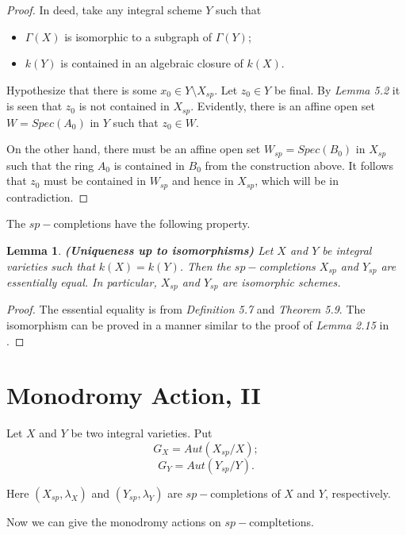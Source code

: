 \documentclass[12pt,twoside,reqno]{amsart}
\newtheorem{lemma}[theorem]{Lemma}
\theoremstyle{definition}
\numberwithin{equation}{section}
\begin{document}
\begin{proof}
In deed, take any integral scheme $Y$ such that
\begin{itemize}
\item $\Gamma (X)$ is isomorphic to a subgraph of $\Gamma (Y)$;

\item $k(Y)$ is contained in an algebraic closure of $k(X)$.
\end{itemize}

 Hypothesize that there is some $x_{0}\in Y \setminus X_{sp}$. Let $z_{0}\in Y$ be final. By \emph{Lemma 5.2} it is seen that $z_{0}$ is not contained in $X_{sp}$. Evidently, there is an affine open set $W=Spec(A_{0})$ in $Y$ such that $z_{0}\in W$.

 On the other hand, there must be an affine open set $W_{sp}=Spec(B_{0})$ in $X_{sp}$ such that the ring $A_{0}$ is contained in $B_{0}$ from the construction above. It follows that $z_{0}$ must be contained in $W_{sp}$ and hence in $X_{sp}$, which will be in contradiction.
\end{proof}

The $sp-$completions have the following property.

\begin{lemma}
\emph{\textbf{(Uniqueness up to isomorphisms)}}
Let $X$ and $Y$ be integral varieties such that $k(X)=k(Y)$. Then the $sp-$completions $X_{sp}$ and $Y_{sp}$ are essentially equal. In particular,  $X_{sp}$ and $Y_{sp}$ are isomorphic schemes.
\end{lemma}

\begin{proof}
The essential equality is from \emph{Definition 5.7} and \emph{Theorem 5.9}. The isomorphism can be proved in a manner similar to the proof of \emph{Lemma 2.15} in \cite{An4*}.
\end{proof}

\section{Monodromy Action, II}

Let $X$ and $Y$ be two integral varieties. Put $$G_{X}=Aut(X_{sp}/X);$$ $$G_{Y}=Aut(Y_{sp}/Y).$$

Here $(X_{sp},\lambda_{X})$ and $(Y_{sp},\lambda_{Y})$ are $sp-$completions of $X$ and $Y$, respectively.

Now we can give the monodromy actions on $sp-$compltetions.
\end{document}
